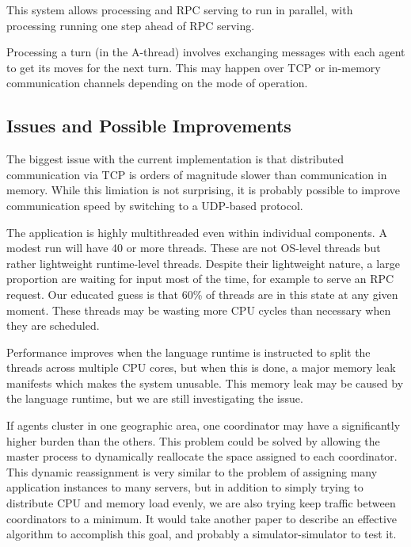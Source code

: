 This system allows processing and RPC serving to run in parallel, with processing running one step
ahead of RPC serving.

Processing a turn (in the A-thread) involves exchanging messages with each agent to get its moves
for the next turn. This may happen over TCP or in-memory communication channels depending on the
mode of operation.

\subsection{Issues and Possible Improvements}

The biggest issue with the current implementation is that distributed communication via TCP is
orders of magnitude slower than communication in memory. While this limiation is not surprising, it
is probably possible to improve communication speed by switching to a UDP-based protocol.

The application is highly multithreaded even within individual components. A modest run will have 40
or more threads. These are not OS-level threads but rather lightweight runtime-level threads.
Despite their lightweight nature, a large proportion are waiting for input most of the time, for
example to serve an RPC request. Our educated guess is that 60\% of threads are in this state at any
given moment. These threads may be wasting more CPU cycles than necessary when they are scheduled.

Performance improves when the language runtime is instructed to split the threads across multiple
CPU cores, but when this is done, a major memory leak manifests which makes the system unusable.
This memory leak may be caused by the language runtime, but we are still investigating the issue.

If agents cluster in one geographic area, one coordinator may have a significantly higher burden
than the others. This problem could be solved by allowing the master process to dynamically
reallocate the space assigned to each coordinator. This dynamic reassignment is very similar to the
problem of assigning many application instances to many servers, but in addition to simply trying to
distribute CPU and memory load evenly, we are also trying keep traffic between coordinators to a
minimum. It would take another paper to describe an effective algorithm to accomplish this goal, and
probably a simulator-simulator to test it.
